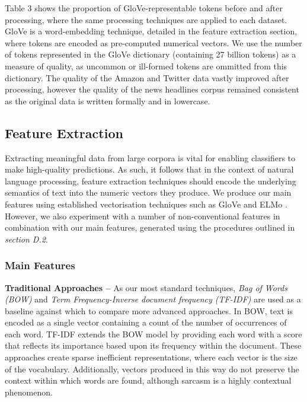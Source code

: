 \documentclass[12pt,a4paper]{article}
\begin{document}
\noindent Table 3 shows the proportion of GloVe-representable tokens before and after processing, where the same processing techniques are applied to each dataset. GloVe is a word-embedding technique, detailed in the feature extraction section, where tokens are encoded as pre-computed numerical vectors. We use the number of tokens represented in the GloVe dictionary (containing 27 billion tokens) as a measure of quality, as uncommon or ill-formed tokens are ommitted from this dictionary. The quality of the Amazon and Twitter data vastly improved after processing, however the quality of the news headlines corpus remained consistent as the original data is written formally and in lowercase.



\subsection{Feature Extraction}
\vspace{-4.2pt}
\noindent Extracting meaningful data from large corpora is vital for enabling classifiers to make high-quality predictions. As such, it follows that in the context of natural language processing, feature extraction techniques should encode the underlying semantics of text into the numeric vectors they produce. We produce our main features using established vectorisation techniques such as GloVe \cite{pennington2014glove} and ELMo \cite{peters2018deep}. However, we also experiment with a number of non-conventional features in combination with our main features, generated using the procedures outlined in \textit{section D.2}. \vspace{-4.2pt}

\subsubsection{Main Features}
\noindent \textbf{Traditional Approaches --} As our most standard techniques, \textit{Bag of Words (BOW)} and \textit{Term Frequency-Inverse document frequency (TF-IDF)} \cite{robertson1976relevance} are used as a baseline against which to compare more advanced approaches. In BOW, text is encoded as a single vector containing a count of the number of occurrences of each word. TF-IDF extends the BOW model by providing each word with a score that reflects its importance based upon its frequency within the document. These approaches create sparse inefficient representations, where each vector is the size of the vocabulary. Additionally, vectors produced in this way do not preserve the context within which words are found, although sarcasm is a highly contextual phenomenon.\\
\end{document}
